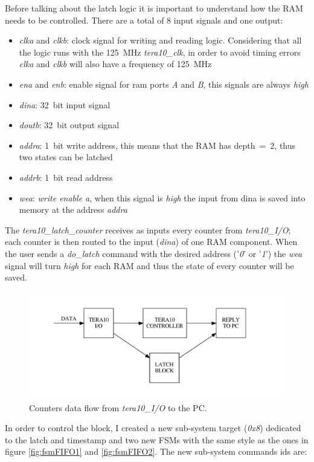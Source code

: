 \noindent Before talking about the latch logic it is important to understand how the RAM needs to be controlled. There are a total of 8 input signals and one output:
\begin{itemize}
	\item \textit{clka} and \textit{clkb}: clock signal for writing and reading logic. Considering that all the logic runs with the 125~MHz \textit{tera10\_clk}, in order to avoid timing errors \textit{clka} and \textit{clkb} will also have a frequency of 125~MHz
	\item \textit{ena} and \textit{enb}: enable signal for ram ports \textit{A} and \textit{B}, this signals are always \textit{high}
	\item \textit{dina}: 32~bit input signal
	\item \textit{doutb}: 32~bit output signal
	\item \textit{addra}: 1~bit write address, this means that the RAM has depth~=~2, thus two states can be latched
	\item \textit{addrb}: 1~bit read address
	\item \textit{wea}: \textit{write enable a}, when this signal is \textit{high} the input from dina is saved into memory at the address \textit{addra}
\end{itemize} 
\noindent The \textit{tera10\_latch\_counter} receives as inputs every counter from \textit{tera10\_I/O}; each counter is then routed to the input (\textit{dina}) of one RAM component. When the user sends a \textit{do\_latch} command with the desired address ('\textit{0}' or '\textit{1}') the \textit{wea} signal will turn \textit{high} for each RAM and thus the state of every counter will be saved.
\begin{figure}[H]
	\centering
	\includegraphics[width=0.7\linewidth]{FSMdiagrams/latch_counter.pdf}
	\caption{Counters data flow from \textit{tera10\_I/O} to the PC.}
	\label{fig:latch_counter}
\end{figure}
\noindent In order to control the block, I created a new sub-system target (\textit{0x8}) dedicated to the latch and timestamp and two new FSMs with the same style as the ones in figure \ref{fig:fsmFIFO1} and \ref{fig:fsmFIFO2}. The new sub-system commands ids are:
